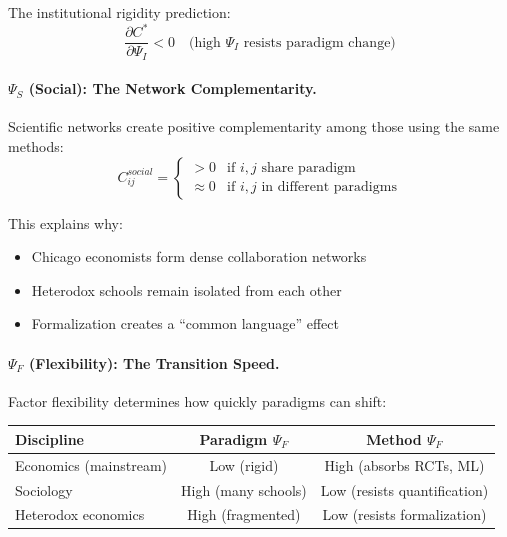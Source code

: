 The institutional rigidity prediction:
\begin{equation}
\frac{\partial C^*}{\partial \Psi_I} < 0 \quad \text{(high $\Psi_I$ resists paradigm change)}
\end{equation}

\paragraph{$\Psi_S$ (Social): The Network Complementarity.}

Scientific networks create positive complementarity among those using
the same methods:
\begin{equation}
C_{ij}^{social} = \begin{cases}
> 0 & \text{if } i,j \text{ share paradigm} \\
\approx 0 & \text{if } i,j \text{ in different paradigms}
\end{cases}
\end{equation}

This explains why:
\begin{itemize}[nosep]
    \item Chicago economists form dense collaboration networks
    \item Heterodox schools remain isolated from each other
    \item Formalization creates a ``common language'' effect
\end{itemize}

\paragraph{$\Psi_F$ (Flexibility): The Transition Speed.}

Factor flexibility determines how quickly paradigms can shift:

\begin{center}
\renewcommand{\arraystretch}{1.3}
\small
\begin{tabular}{@{}lcc@{}}
\toprule
\textbf{Discipline} & \textbf{Paradigm $\Psi_F$} & \textbf{Method $\Psi_F$} \\
\midrule
Economics (mainstream) & Low (rigid) & High (absorbs RCTs, ML) \\
Sociology & High (many schools) & Low (resists quantification) \\
Heterodox economics & High (fragmented) & Low (resists formalization) \\
\bottomrule
\end{tabular}
\end{center}

